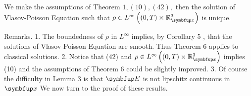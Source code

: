 

\begin{theorem}
We make the assumptions of Theorem $1,(10),(42),$ then the solution of Vlasov-Poisson Equation such that $\rho \in L^{\infty}\left((0, T) \times \mathbb{R}_{\vx}^{3}\right)$ is unique.
\end{theorem}


Remarks. 1. The boundedness of $\rho$ in $L^{\infty}$ implies, by Corollary 5 , that the solutions of Vlasov-Poisson Equation are smooth. Thus Theorem 6 applies to classical solutions.
2. Notice that (42) and $\rho \in L^{\infty}\left((0, T) \times \mathbb{R}_{\vx}^{3}\right)$ implies (10) and the assumptions of Theorem 6 could be slightly improved.
3. Of course the difficulty in Lemma 3 is that $\vE$ is not lipschitz continuous in $\vx$
We now turn to the proof of these results.


